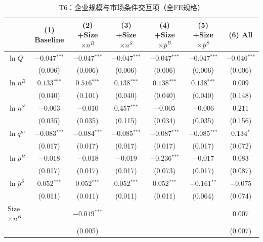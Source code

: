 \documentclass[12pt]{article}
\newcommand{\sym}[1]{\ensuremath{^{\text{#1}}}}
\newcommand{\se}[1]{{\small(#1)}}
\newcommand{\mis}{}
\begin{document}
\begin{table}[H]
  \centering
  \caption{T6：企业规模与市场条件交互项（全FE规格）}
  \begin{threeparttable}
    \begin{tabular}{lcccccc}
      \toprule
       & (1) Baseline & (2) +Size$\times n^B$ & (3) +Size$\times n^S$
         & (4) +Size$\times\bar{p}^{B}$ & (5) +Size$\times\bar{p}^{S}$ & (6) All \\
      \midrule
      $\ln Q$      & $-0.047\sym{***}$ & $-0.047\sym{***}$ & $-0.047\sym{***}$ & $-0.047\sym{***}$ & $-0.047\sym{***}$ & $-0.046\sym{***}$ \\
                   & \se{0.006}        & \se{0.006}        & \se{0.006}        & \se{0.006}        & \se{0.006}        & \se{0.006} \\[4pt]
      $\ln n^B$    & $0.133\sym{***}$ & $0.516\sym{***}$ & $0.138\sym{***}$ & $0.138\sym{***}$ & $0.138\sym{***}$ & $0.009$ \\
                   & \se{0.040}       & \se{0.101}       & \se{0.040}       & \se{0.040}       & \se{0.040}       & \se{0.148} \\[4pt]
      $\ln n^S$    & $-0.003$ & $-0.010$ & $0.457\sym{***}$ & $-0.005$ & $-0.006$ & $0.211$  \\
                   & \se{0.035} & \se{0.035} & \se{0.115}       & \se{0.034} & \se{0.035} & \se{0.156} \\[4pt]
      $\ln q^m$    & $-0.083\sym{***}$ & $-0.084\sym{***}$ & $-0.085\sym{***}$ & $-0.087\sym{***}$ & $-0.085\sym{***}$ & $0.134\sym{*}$ \\
                   & \se{0.017}        & \se{0.017}        & \se{0.017}        & \se{0.017}        & \se{0.017}        & \se{0.072} \\[4pt]
      $\ln\bar{p}^{B}$ & $-0.018$ & $-0.018$ & $-0.019$ & $-0.236\sym{***}$ & $-0.017$ & $0.083$ \\
                     & \se{0.017} & \se{0.017} & \se{0.017} & \se{0.073} & \se{0.017} & \se{0.087} \\[4pt]
      $\ln\bar{p}^{S}$ & $0.052\sym{***}$ & $0.052\sym{***}$ & $0.052\sym{***}$ & $0.052\sym{***}$ & $-0.161\sym{**}$ & $-0.075$ \\
                     & \se{0.011} & \se{0.011} & \se{0.011} & \se{0.011} & \se{0.064} & \se{0.074} \\[4pt]
      Size$\times n^B$        & \mis & $-0.019\sym{***}$ & \mis & \mis & \mis & $0.007$ \\
                              &     & \se{0.005}        &     &     &     & \se{0.007} \\[4pt]

\end{tabular}
\end{threeparttable}
\end{table}
\end{document}
